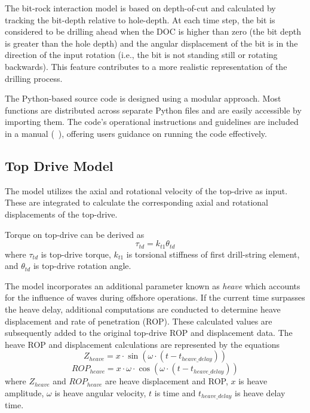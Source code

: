 The bit-rock interaction model is based on depth-of-cut and calculated by tracking the bit-depth relative to hole-depth. At each time step, the bit is considered to be drilling ahead when the DOC is higher than zero (the bit depth is greater than the hole depth) and the angular displacement of the bit is in the direction of the input rotation (i.e., the bit is not standing still or rotating backwards).  This feature contributes to a more realistic representation of the drilling process.

The Python-based source code is designed using a modular approach.  Most functions are distributed across separate Python files and are easily accessible by importing them. The code's operational instructions and guidelines are included in a manual (~\cite{ref:dixit2021a}), offering users guidance on running the code effectively.

\subsection{Top Drive Model}
The model utilizes the axial and rotational velocity of the top-drive as input. These are integrated to calculate the corresponding axial and rotational displacements of the top-drive.

Torque on top-drive can be derived as
\begin{equation}\label{TorqueEQ}
  \tau_{td} = k_{t1} \theta_{td}
\end{equation}
where $\tau_{td}$ is top-drive torque, $k_{t1}$ is torsional stiffness of first drill-string element, and $\theta_{td}$ is top-drive rotation angle. 

The model incorporates an additional parameter known as \emph{heave} which accounts for the influence of waves during offshore operations. If the current time surpasses the heave delay, additional computations are conducted to determine heave displacement and rate of penetration (ROP). These calculated values are subsequently added to the original top-drive ROP and displacement data. The heave ROP and displacement calculations are represented by the equations
\begin{equation}\label{Z_heave}
  Z_{heave} = x \cdot \sin(\omega \cdot (t - t_{heave\_delay}))
\end{equation}
\begin{equation}\label{ROP_heave}
  ROP_{heave} = x \cdot \omega \cdot \cos(\omega \cdot (t - t_{heave\_delay}))
\end{equation}
where
$Z_{heave}$ and $ROP_{heave}$ are heave displacement and ROP, $x$ is heave amplitude, $\omega$ is heave angular velocity, $t$ is time and $t_{heave\_delay}$ is heave delay time.


